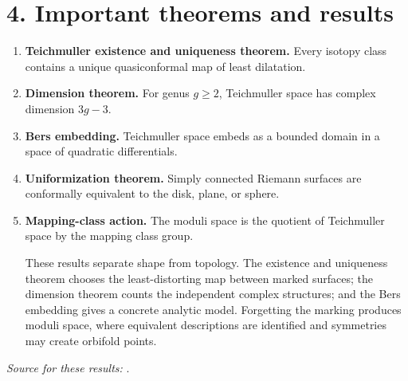 \section*{4. Important theorems and results}
\begin{enumerate}[leftmargin=*,itemsep=0.35em]
\item \textbf{Teichmuller existence and uniqueness theorem.} Every isotopy class contains a unique quasiconformal map of least dilatation.

\item \textbf{Dimension theorem.} For genus $g\geq2$, Teichmuller space has complex dimension $3g-3$.

\item \textbf{Bers embedding.} Teichmuller space embeds as a bounded domain in a space of quadratic differentials.

\item \textbf{Uniformization theorem.} Simply connected Riemann surfaces are conformally equivalent to the disk, plane, or sphere.

\item \textbf{Mapping-class action.} The moduli space is the quotient of Teichmuller space by the mapping class group.

These results separate shape from topology. The existence and uniqueness theorem chooses the least-distorting map between marked surfaces; the dimension theorem counts the independent complex structures; and the Bers embedding gives a concrete analytic model. Forgetting the marking produces moduli space, where equivalent descriptions are identified and symmetries may create orbifold points.
\end{enumerate}
\noindent\emph{Source for these results:} \cite{teich_ref1}.

\theoryapplications
{}

